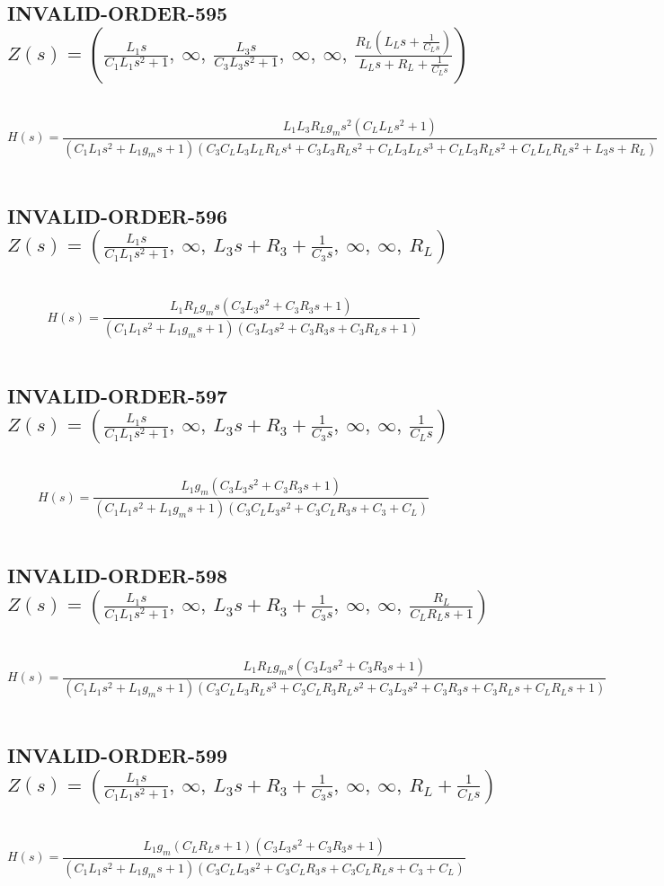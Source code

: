 \documentclass{article}
\begin{document}
\subsection{INVALID-ORDER-595 $Z(s) = \left( \frac{L_{1} s}{C_{1} L_{1} s^{2} + 1}, \  \infty, \  \frac{L_{3} s}{C_{3} L_{3} s^{2} + 1}, \  \infty, \  \infty, \  \frac{R_{L} \left(L_{L} s + \frac{1}{C_{L} s}\right)}{L_{L} s + R_{L} + \frac{1}{C_{L} s}}\right)$ } \ 
\textbf{\[H(s) = \frac{L_{1} L_{3} R_{L} g_{m} s^{2} \left(C_{L} L_{L} s^{2} + 1\right)}{\left(C_{1} L_{1} s^{2} + L_{1} g_{m} s + 1\right) \left(C_{3} C_{L} L_{3} L_{L} R_{L} s^{4} + C_{3} L_{3} R_{L} s^{2} + C_{L} L_{3} L_{L} s^{3} + C_{L} L_{3} R_{L} s^{2} + C_{L} L_{L} R_{L} s^{2} + L_{3} s + R_{L}\right)}\] } \ 
\subsection{INVALID-ORDER-596 $Z(s) = \left( \frac{L_{1} s}{C_{1} L_{1} s^{2} + 1}, \  \infty, \  L_{3} s + R_{3} + \frac{1}{C_{3} s}, \  \infty, \  \infty, \  R_{L}\right)$ } \ 
\textbf{\[H(s) = \frac{L_{1} R_{L} g_{m} s \left(C_{3} L_{3} s^{2} + C_{3} R_{3} s + 1\right)}{\left(C_{1} L_{1} s^{2} + L_{1} g_{m} s + 1\right) \left(C_{3} L_{3} s^{2} + C_{3} R_{3} s + C_{3} R_{L} s + 1\right)}\] } \ 
\subsection{INVALID-ORDER-597 $Z(s) = \left( \frac{L_{1} s}{C_{1} L_{1} s^{2} + 1}, \  \infty, \  L_{3} s + R_{3} + \frac{1}{C_{3} s}, \  \infty, \  \infty, \  \frac{1}{C_{L} s}\right)$ } \ 
\textbf{\[H(s) = \frac{L_{1} g_{m} \left(C_{3} L_{3} s^{2} + C_{3} R_{3} s + 1\right)}{\left(C_{1} L_{1} s^{2} + L_{1} g_{m} s + 1\right) \left(C_{3} C_{L} L_{3} s^{2} + C_{3} C_{L} R_{3} s + C_{3} + C_{L}\right)}\] } \ 
\subsection{INVALID-ORDER-598 $Z(s) = \left( \frac{L_{1} s}{C_{1} L_{1} s^{2} + 1}, \  \infty, \  L_{3} s + R_{3} + \frac{1}{C_{3} s}, \  \infty, \  \infty, \  \frac{R_{L}}{C_{L} R_{L} s + 1}\right)$ } \ 
\textbf{\[H(s) = \frac{L_{1} R_{L} g_{m} s \left(C_{3} L_{3} s^{2} + C_{3} R_{3} s + 1\right)}{\left(C_{1} L_{1} s^{2} + L_{1} g_{m} s + 1\right) \left(C_{3} C_{L} L_{3} R_{L} s^{3} + C_{3} C_{L} R_{3} R_{L} s^{2} + C_{3} L_{3} s^{2} + C_{3} R_{3} s + C_{3} R_{L} s + C_{L} R_{L} s + 1\right)}\] } \ 
\subsection{INVALID-ORDER-599 $Z(s) = \left( \frac{L_{1} s}{C_{1} L_{1} s^{2} + 1}, \  \infty, \  L_{3} s + R_{3} + \frac{1}{C_{3} s}, \  \infty, \  \infty, \  R_{L} + \frac{1}{C_{L} s}\right)$ } \ 
\textbf{\[H(s) = \frac{L_{1} g_{m} \left(C_{L} R_{L} s + 1\right) \left(C_{3} L_{3} s^{2} + C_{3} R_{3} s + 1\right)}{\left(C_{1} L_{1} s^{2} + L_{1} g_{m} s + 1\right) \left(C_{3} C_{L} L_{3} s^{2} + C_{3} C_{L} R_{3} s + C_{3} C_{L} R_{L} s + C_{3} + C_{L}\right)}\] } \ 
\end{document}
